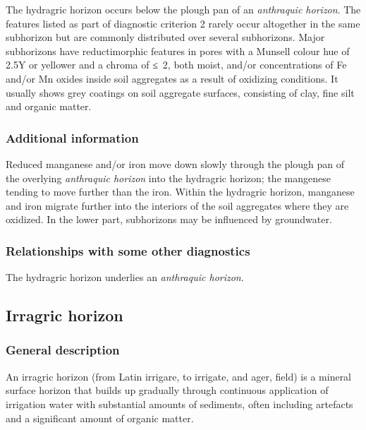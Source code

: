 \documentclass[
  letterpaper,
  DIV=11,
  numbers=noendperiod]{scrreprt}
\begin{document}
The hydragric horizon occurs below the plough pan of an \emph{anthraquic
horizon}. The features listed as part of diagnostic criterion 2 rarely
occur altogether in the same subhorizon but are commonly distributed
over several subhorizons. Major subhorizons have reductimorphic features
in pores with a Munsell colour hue of 2.5Y or yellower and a chroma of
≤~2, both moist, and/or concentrations of Fe and/or Mn oxides inside
soil aggregates as a result of oxidizing conditions. It usually shows
grey coatings on soil aggregate surfaces, consisting of clay, fine silt
and organic matter.

\hypertarget{additional-information-9}{%
\subsubsection{Additional information}\label{additional-information-9}}

Reduced manganese and/or iron move down slowly through the plough pan of
the overlying \emph{anthraquic horizon} into the hydragric horizon; the
mangenese tending to move further than the iron. Within the hydragric
horizon, manganese and iron migrate further into the interiors of the
soil aggregates where they are oxidized. In the lower part, subhorizons
may be influenced by groundwater.

\hypertarget{relationships-with-some-other-diagnostics-16}{%
\subsubsection{Relationships with some other
diagnostics}\label{relationships-with-some-other-diagnostics-16}}

The hydragric horizon underlies an \emph{anthraquic horizon}.

\hypertarget{irragric-horizon}{%
\subsection{Irragric horizon}\label{irragric-horizon}}

\hypertarget{general-description-17}{%
\subsubsection{General description}\label{general-description-17}}

An irragric horizon (from Latin irrigare, to irrigate, and ager, field)
is a mineral surface horizon that builds up gradually through continuous
application of irrigation water with substantial amounts of sediments,
often including artefacts and a significant amount of organic matter.
\end{document}
